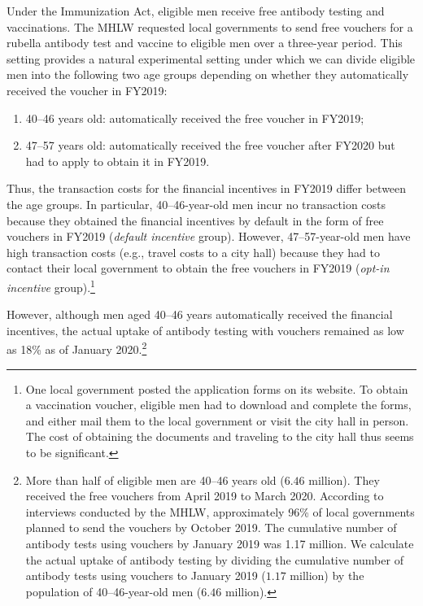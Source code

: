 \documentclass[
]{article}
\providecommand{\tightlist}{%
  \setlength{\itemsep}{0pt}\setlength{\parskip}{0pt}}
\begin{document}
Under the Immunization Act, eligible men receive free antibody testing and vaccinations. The MHLW requested local governments to send free vouchers for a rubella antibody test and vaccine to eligible men over a three-year period. This setting provides a natural experimental setting under which we can divide eligible men into the following two age groups depending on whether they automatically received the voucher in FY2019:

\begin{enumerate}
\def\labelenumi{\arabic{enumi}.}
\tightlist
\item
  40--46 years old: automatically received the free voucher in FY2019;
\item
  47--57 years old: automatically received the free voucher after FY2020 but had to apply to obtain it in FY2019.
\end{enumerate}

Thus, the transaction costs for the financial incentives in FY2019 differ between the age groups. In particular, 40--46-year-old men incur no transaction costs because they obtained the financial incentives by default in the form of free vouchers in FY2019 (\emph{default incentive} group). However, 47--57-year-old men have high transaction costs (e.g., travel costs to a city hall) because they had to contact their local government to obtain the free vouchers in FY2019 (\emph{opt-in incentive} group).\footnote{One local government posted the application forms on its website. To obtain a vaccination voucher, eligible men had to download and complete the forms, and either mail them to the local government or visit the city hall in person. The cost of obtaining the documents and traveling to the city hall thus seems to be significant.}

However, although men aged 40--46 years automatically received the financial incentives, the actual uptake of antibody testing with vouchers remained as low as 18\% as of January 2020.\footnote{More than half of eligible men are 40--46 years old (\(6.46\) million). They received the free vouchers from April 2019 to March 2020. According to interviews conducted by the MHLW, approximately 96\% of local governments planned to send the vouchers by October 2019. The cumulative number of antibody tests using vouchers by January 2019 was 1.17 million. We calculate the actual uptake of antibody testing by dividing the cumulative number of antibody tests using vouchers to January 2019 (\(1.17\) million) by the population of 40--46-year-old men (\(6.46\) million).}
\end{document}
